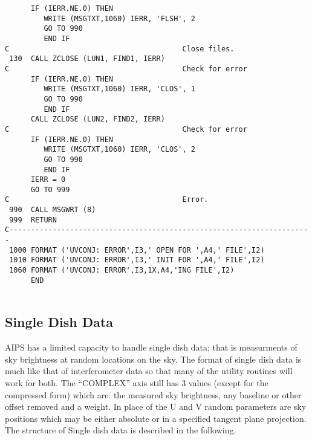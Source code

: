 \begin{verbatim}
      IF (IERR.NE.0) THEN
         WRITE (MSGTXT,1060) IERR, 'FLSH', 2
         GO TO 990
         END IF
C                                        Close files.
 130  CALL ZCLOSE (LUN1, FIND1, IERR)
C                                        Check for error
      IF (IERR.NE.0) THEN
         WRITE (MSGTXT,1060) IERR, 'CLOS', 1
         GO TO 990
         END IF
      CALL ZCLOSE (LUN2, FIND2, IERR)
C                                        Check for error
      IF (IERR.NE.0) THEN
         WRITE (MSGTXT,1060) IERR, 'CLOS', 2
         GO TO 990
         END IF
      IERR = 0
      GO TO 999
C                                        Error.
 990  CALL MSGWRT (8)
 999  RETURN
C----------------------------------------------------------------------
 1000 FORMAT ('UVCONJ: ERROR',I3,' OPEN FOR ',A4,' FILE',I2)
 1010 FORMAT ('UVCONJ: ERROR',I3,' INIT FOR ',A4,' FILE',I2)
 1060 FORMAT ('UVCONJ: ERROR',I3,1X,A4,'ING FILE',I2)
      END


\end{verbatim}
\subsection{Single Dish Data}

AIPS has a limited capacity to handle single dish data; that is
measurments of sky brightness at random locations on the sky.  The
format of single dish data is much like that of interferometer data so
that many of the utility routines will work for both.  The ``COMPLEX''
axis still has 3 values (except for the compressed form) which are:
the measured sky brightness, any baseline or other offset removed
and a weight.  In place of the U and V random parameters are sky
positions which may be either absolute or in a specified tangent plane
projection.  The structure of Single dish data is described in the
following.

